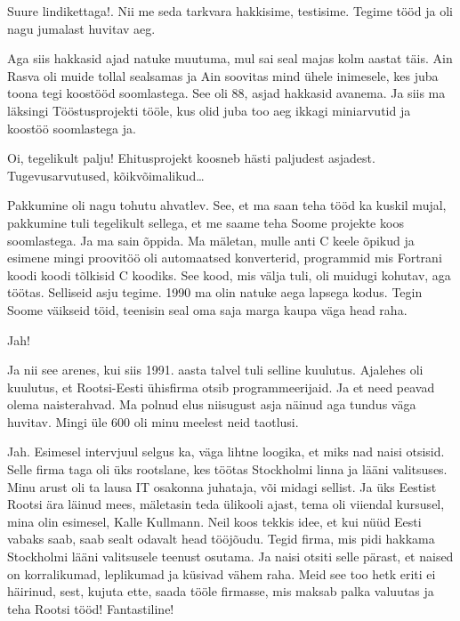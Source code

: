 
Suure lindikettaga!. Nii me seda tarkvara hakkisime, testisime. Tegime tööd ja oli nagu jumalast huvitav aeg.

Aga siis hakkasid ajad natuke muutuma, mul sai seal majas kolm aastat täis. Ain Rasva oli muide tollal sealsamas ja Ain soovitas mind ühele inimesele, kes juba toona tegi koostööd soomlastega. See oli 88, asjad hakkasid avanema. Ja siis ma läksingi Tööstusprojekti tööle, kus  olid juba too aeg ikkagi miniarvutid ja koostöö soomlastega ja. 


Oi, tegelikult palju! Ehitusprojekt koosneb  hästi paljudest asjadest. Tugevusarvutused, kõikvõimalikud\ldots 


Pakkumine oli nagu tohutu ahvatlev. See, et ma saan teha tööd ka kuskil mujal, pakkumine tuli tegelikult sellega, et me saame teha Soome projekte koos soomlastega. Ja ma sain õppida. Ma mäletan, mulle anti C keele õpikud ja esimene mingi proovitöö oli automaatsed konverterid,  programmid mis  Fortrani koodi koodi tõlkisid C koodiks. See kood, mis välja tuli, oli muidugi kohutav, aga töötas. Selliseid asju tegime. 1990 ma olin natuke aega lapsega kodus. Tegin Soome väikseid töid, teenisin seal oma saja marga kaupa  väga head raha. 


Jah!

Ja nii see arenes, kui siis 1991. aasta talvel tuli selline kuulutus. Ajalehes oli kuulutus, et Rootsi-Eesti ühisfirma otsib programmeerijaid. Ja et need peavad olema naisterahvad. Ma polnud elus niisugust asja näinud aga tundus väga huvitav. Mingi üle 600 oli minu meelest neid taotlusi. 


Jah. Esimesel intervjuul selgus ka, väga lihtne loogika, et miks nad naisi otsisid. Selle firma taga oli üks rootslane, kes töötas Stockholmi linna ja lääni valitsuses. Minu arust oli ta lausa IT osakonna juhataja, või midagi sellist. Ja  üks Eestist Rootsi ära läinud mees, mäletasin teda ülikooli ajast, tema oli viiendal kursusel, mina olin esimesel, Kalle Kullmann. Neil koos tekkis idee, et kui nüüd Eesti vabaks saab, saab sealt odavalt head tööjõudu. Tegid firma, mis pidi hakkama Stockholmi lääni valitsusele teenust osutama. Ja naisi otsiti selle pärast, et naised on korralikumad, leplikumad ja küsivad vähem raha. Meid see too hetk eriti ei häirinud, sest, kujuta ette, saada tööle firmasse, mis maksab palka valuutas ja teha Rootsi tööd! Fantastiline!


